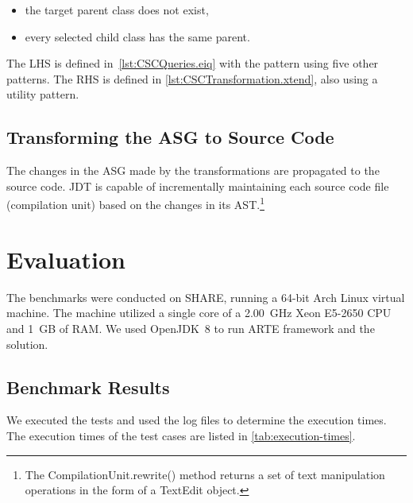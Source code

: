 \documentclass[submission,copyright,creativecommons]{eptcs}
\begin{document}
\begin{itemize}[noitemsep]
	\item the target parent class does not exist,
	\item every selected child class has the same parent.
\end{itemize}

The LHS is defined in~\autoref{lst:CSCQueries.eiq} with the  pattern using five other patterns. The RHS is defined in \autoref{lst:CSCTransformation.xtend}, also using a utility pattern.

\subsection[Transforming the ASG to Source Code]{Transforming the ASG to Source Code\qquad{}}

The changes in the ASG made by the transformations are propagated to the source code. JDT is capable of incrementally maintaining each source code file (compilation unit) based on the changes in its AST.\footnote{The \textsf{CompilationUnit.rewrite()} method returns a set of text manipulation operations in the form of a \textsf{TextEdit} object.}

\section{Evaluation}

The benchmarks were conducted on SHARE, running a 64-bit Arch Linux virtual machine. The machine utilized a single core of a 2.00~GHz Xeon E5-2650 CPU and 1~GB of RAM. We used OpenJDK~8 to run ARTE framework and the solution.

\subsection{Benchmark Results}

We executed the tests and used the log files to determine the execution times. The execution times of the test cases are listed in \autoref{tab:execution-times}. 
\end{document}
